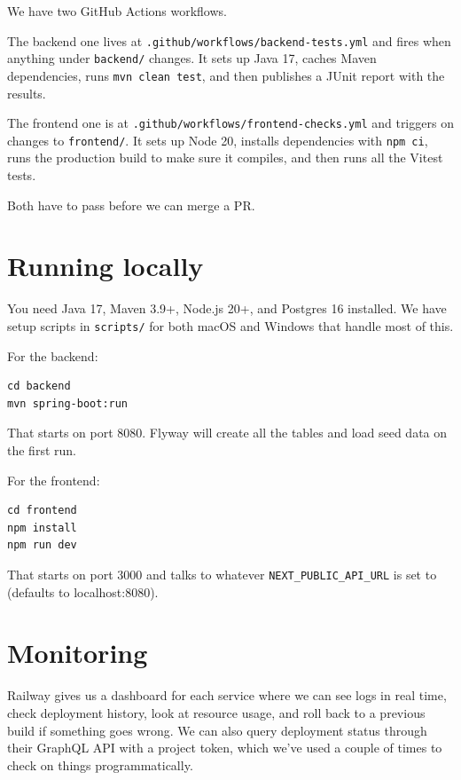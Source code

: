 \documentclass[a4paper,11pt]{article}
\begin{document}
We have two GitHub Actions workflows.

The backend one lives at \texttt{.github/workflows/backend-tests.yml} and fires when anything under \texttt{backend/} changes. It sets up Java 17, caches Maven dependencies, runs \texttt{mvn clean test}, and then publishes a JUnit report with the results.

The frontend one is at \texttt{.github/workflows/frontend-checks.yml} and triggers on changes to \texttt{frontend/}. It sets up Node 20, installs dependencies with \texttt{npm ci}, runs the production build to make sure it compiles, and then runs all the Vitest tests.

Both have to pass before we can merge a PR.

\section{Running locally}

You need Java 17, Maven 3.9+, Node.js 20+, and Postgres 16 installed. We have setup scripts in \texttt{scripts/} for both macOS and Windows that handle most of this.

For the backend:

\begin{lstlisting}
cd backend
mvn spring-boot:run
\end{lstlisting}

That starts on port 8080. Flyway will create all the tables and load seed data on the first run.

For the frontend:

\begin{lstlisting}
cd frontend
npm install
npm run dev
\end{lstlisting}

That starts on port 3000 and talks to whatever \texttt{NEXT\_PUBLIC\_API\_URL} is set to (defaults to localhost:8080).

\section{Monitoring}

Railway gives us a dashboard for each service where we can see logs in real time, check deployment history, look at resource usage, and roll back to a previous build if something goes wrong. We can also query deployment status through their GraphQL API with a project token, which we've used a couple of times to check on things programmatically.
\end{document}
